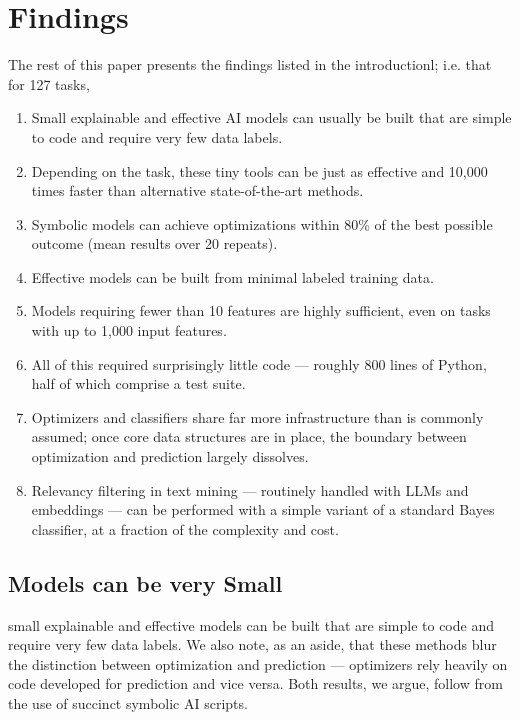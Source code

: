 \documentclass[AMA,STIX2COL]{WileyNJDv5}
\begin{document}
\section{Findings}

The rest of this paper presents the findings listed in the introductionl;
i.e. that for 127 tasks,
\begin{enumerate}
\item \label{claim:effective}
  Small explainable and effective AI models can usually be built
  that are simple to code and require very few data labels.
\item \label{claim:fast}
  Depending on the task, these tiny tools can be just as effective
  and 10,000 times faster than alternative state-of-the-art methods.
\item \label{claim:80percent}
  Symbolic models can achieve optimizations within 80\% of the best
  possible outcome (mean results over 20 repeats).
\item \label{claim:labels}
  Effective models can be built from minimal labeled training data.
\item \label{claim:features}
  Models requiring fewer than 10 features are highly sufficient,
  even on tasks with up to 1,000 input features.
\item \label{claim:loc}
  All of this required surprisingly little code --- roughly 800 lines
  of Python, half of which comprise a test suite.
\item \label{claim:shared}
  Optimizers and classifiers share far more infrastructure than is
  commonly assumed; once core data structures are in place, the
  boundary between optimization and prediction largely dissolves.
\item \label{claim:bayes}
  Relevancy filtering in text mining --- routinely handled with LLMs
  and embeddings --- can be performed with a simple variant of a
  standard Bayes classifier, at a fraction of the complexity and cost.
\end{enumerate}

\subsection{Models can be very Small}


small explainable and effective models can be built that are simple to code and require very few data labels. We also note, as an aside, that these methods blur the distinction between optimization and prediction — optimizers rely heavily on code developed for prediction and vice versa. Both results, we argue, follow from the use of succinct symbolic AI scripts.
\end{document}

